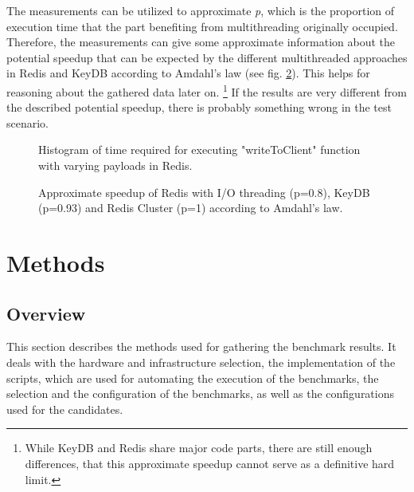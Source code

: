 The measurements can be utilized to approximate \textit{p}, which is the proportion of execution time that the part benefiting from multithreading originally occupied. Therefore, the measurements can give some approximate information about the potential speedup that can be expected by the different multithreaded approaches in Redis and KeyDB according to Amdahl’s law (see fig. \ref{fig:amdahl}). This helps for reasoning about the gathered data later on.
\footnote{While KeyDB and Redis share major code parts, there are still enough differences, that this approximate speedup cannot serve as a definitive hard limit.} If the results are very different from the described potential speedup, there is probably something wrong in the test scenario. 
\begin{figure}
    \centering
    \scalebox{0.5}{}
    \caption{Histogram of time required for executing "writeToClient" function with varying payloads in Redis.}
    \label{fig:monitor_writes}
\end{figure}
\begin{figure}
    \centering
    \scalebox{0.5}{}
    \caption{Approximate speedup of Redis with I/O threading (p=0.8), KeyDB (p=0.93) and Redis Cluster (p=1) according to Amdahl's law.}
    \label{fig:amdahl}
\end{figure}
\section{Methods}
\subsection{Overview}
This section describes the methods used for gathering the benchmark results. \newline
It deals with the hardware and infrastructure selection, the implementation of the scripts, which are used for automating the execution of the benchmarks, the selection and the configuration of the benchmarks, as well as the configurations used for the candidates.
